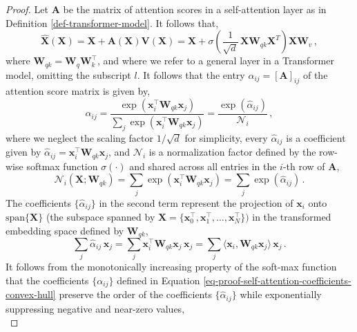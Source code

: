 \begin{proof}
%
Let $\bm{A}$ be the matrix of attention scores in a self-attention layer
as in Definition \ref{def-transformer-model}.
%
It follows that,
%
\begin{equation}
    \hat{\bm{X}}(\bm{X}) = \bm{X} + \bm{A}(\bm{X})\bm{V}(\bm{X}) = \bm{X} + \sigma\left(\frac{1}{\sqrt{d}}\,\bm{X} \bm{W}_{qk}\bm{X}^T\right)\bm{X}\bm{W}_v \,,
\end{equation}
%
where $\bm{W}_{qk} = \bm{W}_q \bm{W}_k^\top$, and where we refer to a general layer in a Transformer model, omitting the subscript $l$.
%
It follows that the entry $\alpha_{ij} = [\bm{A}]_{ij}$ of the attention score matrix is given by, 
%
\begin{equation}
    \alpha_{ij} = \frac{\exp{(\bm{x}_i^\top \bm{W}_{qk} \bm{x}_j)}}{\sum_j \exp{(\bm{x}_i^\top \bm{W}_{qk} \bm{x}_j)}} = \frac{\exp{(\hat{\alpha}_{ij})}}{\mathcal{N}_i} \,,
\label{eq-proof-self-attention-coefficients-convex-hull}
\end{equation}
%
where we neglect the scaling factor $1 / \sqrt{d}$ for simplicity, every $\hat{\alpha}_{ij}$ is a coefficient given by $\hat{\alpha}_{ij} = \bm{x}_i^\top \bm{W}_{qk} \bm{x}_j$, and $\mathcal{N}_i$ is a normalization factor defined by the row-wise softmax function $\sigma(\cdot)$ and shared across all entries in the $i$-th row of $\bm{A}$,
%
\begin{equation}
    \mathcal{N}_i(\bm{X}; \bm{W}_{qk}) = \sum_j \exp{(\bm{x}_i^\top \bm{W}_{qk} \bm{x}_j)} = \sum_j \exp{(\hat{\alpha}_{ij})} \,.
\end{equation}
%
The coefficients $\{\hat{\alpha}_{ij}\}$ in the second term represent the projection of $\bm{x}_i$ onto $\text{span}\{\bm{X}\}$ (the subspace spanned by $\bm{X} = \{\bm{x}_0^\top, \bm{x}_1^\top, \dots, \bm{x}_N^\top\})$ in the transformed embedding space defined by $\bm{W}_{qk}$,
%
\begin{equation}
    \sum_j\hat{\alpha}_{ij}\, \bm{x}_j = \sum_j \bm{x}_i^\top \bm{W}_{qk} \bm{x}_j\,\bm{x}_j = \sum_j \langle \bm{x}_i, \bm{W}_{qk}\bm{x}_j \rangle \,\bm{x}_j \,.
\label{eq-proof-self-attention-bilinear-form}
\end{equation}
%
It follows from the monotonically increasing property of the soft-max function that the coefficients $\{\alpha_{ij}\}$ defined in Equation \eqref{eq-proof-self-attention-coefficients-convex-hull} preserve the order of the coefficients $\{\hat{\alpha}_{ij}\}$ while exponentially suppressing negative and near-zero values,
%
\begin{equation}

\end{equation}
\end{proof}
